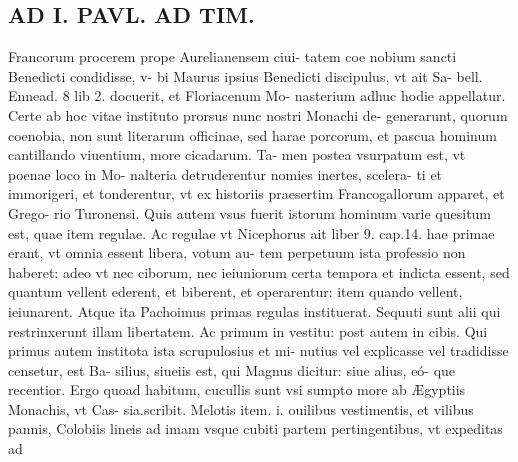 \documentclass{article}
\begin{document}
\begin{pages}
\section*{AD I. PAVL. AD TIM. }
\marginpar{[ p.220 ]}\pstart Francorum procerem prope Aurelianensem ciui- tatem coe nobium sancti Benedicti condidisse, v- bi Maurus ipsius Benedicti discipulus, vt ait Sa- bell. Ennead. 8 lib 2. docuerit, et Floriacenum Mo- nasterium adhuc hodie appellatur. Certe ab hoc vitae instituto prorsus nunc nostri Monachi de- generarunt, quorum coenobia, non sunt literarum officinae, sed harae porcorum, et pascua hominum cantillando viuentium, more cicadarum. Ta- men postea vsurpatum est, vt poenae loco in Mo- nalteria detruderentur nomies inertes, scelera- ti et immorigeri, et tonderentur, vt ex historiis praesertim Francogallorum apparet, et Grego- rio Turonensi.  \pend\pstart Quis autem vsus fuerit istorum hominum varie quesitum est, quae item regulae.  \pend\pstart Ac regulae vt Nicephorus ait liber 9. cap.14. hae primae erant, vt omnia essent libera, votum au- tem perpetuum ista professio non haberet: adeo vt nec ciborum, nec ieiuniorum certa tempora et indicta essent, sed quantum vellent ederent, et biberent, et operarentur: item quando vellent, ieiunarent. Atque ita Pachoimus primas regulas instituerat. Sequuti sunt alii qui restrinxerunt illam libertatem. Ac primum in vestitu: post autem in cibis. Qui primus autem institota ista scrupulosius et mi- nutius vel explicasse vel tradidisse censetur, est Ba- silius, siueiis est, qui Magnus dicitur: siue alius, eó- que recentior. Ergo quoad habitum, cucullis sunt vsi sumpto more ab Ægyptiis Monachis, vt Cas- sia.scribit. Melotis item. i. ouilibus vestimentis, et vilibus pannis, Colobiis lineis ad imam vsque cubiti partem pertingentibus, vt expeditas ad  \pend

\end{pages}
\end{document}

